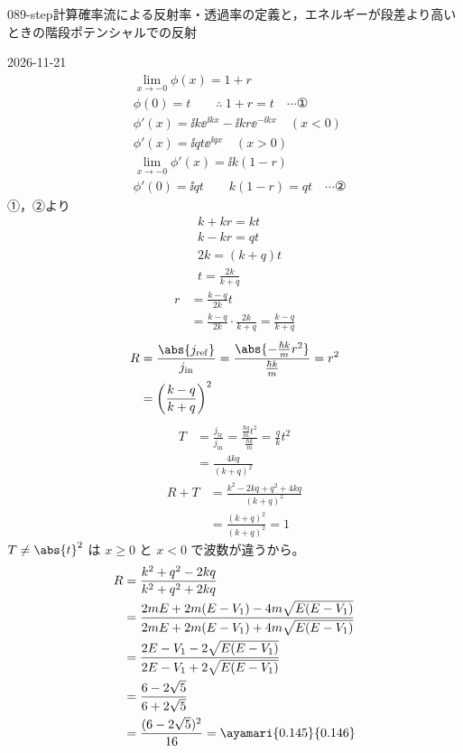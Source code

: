 \documentclass[uplatex,dvipdfmx,a4paper,11pt]{jsarticle}
\begin{document}
\begin{mondai}{089-step}{計算}{確率流による反射率・透過率の定義と，エネルギーが段差より高いときの階段ポテンシャルでの反射}
\begin{kotaeutsushi}{2026-11-21}
\begin{align*}
&\lim_{x\to-0}\phi(x)=1+r\\
&\phi(0)=t\qquad\therefore\ 1+r=t\quad\cdots\text{①}\\
&\phi'(x)=\ii k\ee^{\ii kx}-\ii kr\ee^{-\ii kx}\quad(x<0)\\
&\phi'(x)=\ii qt\ee^{\ii qx}\quad(x>0)\\
&\lim_{x\to-0}\phi'(x)=\ii k(1-r)\\
&\phi'(0)=\ii qt\qquad k(1-r)=qt\quad\cdots\text{②}
\end{align*}
①，②より
\begin{align*}
&k+kr=kt\\
&k-kr=qt\\
&2k=(k+q)t\\
&t=\frac{2k}{k+q}
\end{align*}
\begin{align*}
r&=\frac{k-q}{2k}t\\
&=\frac{k-q}{2k}\cdot\frac{2k}{k+q}=\frac{k-q}{k+q}
\end{align*}
\begin{align*}
R&=\frac{\abs{j_{\mathrm{ref}}}}{j_{\mathrm{in}}}=\frac{\abs{-\frac{\hbar k}{m}r^{2}}}{\frac{\hbar k}{m}}=r^{2}\\
&=\left(\frac{k-q}{k+q}\right)^{2}
\end{align*}
\begin{align*}
T&=\frac{j_{\mathrm{tr}}}{j_{\mathrm{in}}}=\frac{\frac{\hbar q}{m}t^{2}}{\frac{\hbar k}{m}}=\frac{q}{k}t^{2}\\
&=\frac{4kq}{(k+q)^{2}}
\end{align*}
\begin{align*}
R+T&=\frac{k^{2}-2kq+q^{2}+4kq}{(k+q)^{2}}\\
&=\frac{(k+q)^{2}}{(k+q)^{2}}=1
\end{align*}
$T\neq\abs{t}^{2}$ は $x\ge0$ と $x<0$ で波数が違うから。
\begin{align*}
R&=\frac{k^{2}+q^{2}-2kq}{k^{2}+q^{2}+2kq}\\
&=\frac{2mE+2m(E-V_{1})-4m\sqrt{E(E-V_{1})}}{2mE+2m(E-V_{1})+4m\sqrt{E(E-V_{1})}}\\
&=\frac{2E-V_{1}-2\sqrt{E(E-V_{1})}}{2E-V_{1}+2\sqrt{E(E-V_{1})}}\\
&=\frac{6-2\sqrt{5}}{6+2\sqrt{5}}\\
&=\frac{(6-2\sqrt{5})^{2}}{16}=\ayamari{0.145}{0.146}
\end{align*}

\end{kotaeutsushi}
\end{mondai}
\end{document}
